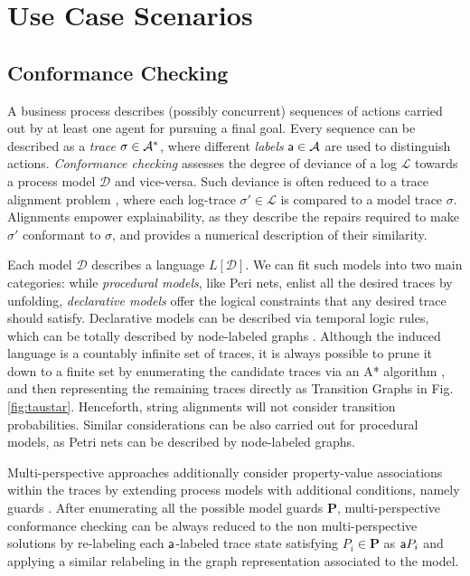\section{Use Case Scenarios}
\subsection{Conformance Checking}
A business process describes (possibly concurrent) sequences of actions carried out by at least one agent for pursuing a final goal. Every sequence can be described as a \textit{trace} $\sigma\in\mathcal{A}^*$, where different \textit{labels} $\mathsf{a}\in\mathcal{A}$ are used to distinguish actions.
\textit{Conformance checking} assesses the degree of deviance of a log $\mathcal{L}$ towards a process model $\mathcal{D}$ and vice-versa. Such deviance is often reduced to a trace alignment problem \cite{DBLP:conf/edoc/AdriansyahDA11}, where each log-trace $\sigma'\in\mathcal{L}$ is compared to a model trace $\sigma$. Alignments empower explainability, as they describe the repairs required to make $\sigma'$ conformant to $\sigma$, and provides a numerical description of their similarity.

Each model $\mathcal{D}$ describes a language $L[\mathcal{D}]$. We can fit such models into two main categories: while \textit{procedural models}, like Peri nets, enlist all the desired traces by unfolding, \textit{declarative models} offer the logical constraints that any desired trace should satisfy. Declarative models can be described via temporal logic rules, which can be totally described by node-labeled graphs \cite{GiacomoMM14}. Although the induced language is a countably infinite set of traces, it is always possible to prune it down to a finite set  by enumerating the candidate traces via an A* algorithm \cite{LeoniMA12}, and then representing the remaining traces directly as Transition Graphs in Fig. \ref{fig:taustar}. Henceforth, string alignments will not consider transition probabilities. Similar considerations can be also carried out for procedural models, as Petri nets can be described by node-labeled graphs. %

Multi-perspective approaches additionally consider property-value associations within the traces by extending process models with additional conditions, namely guards \cite{MannhardtLRA16}. After enumerating all the possible model guards $\mathbf{P}$, multi-perspective conformance checking can be always reduced to the non multi-perspective solutions by re-labeling each $\mathsf{a}$-labeled trace state satisfying $P_i\in\mathbf{P}$ as $\mathsf{a}{P_i}$ and applying a similar relabeling in the graph representation associated to the model.



